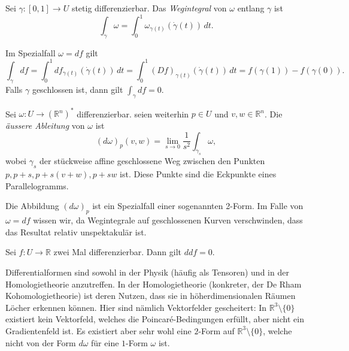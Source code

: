 \documentclass[../main.tex]{subfiles}
\begin{document}
\begin{definition}
  Sei $\gamma \colon [0, 1] \to U$ stetig differenzierbar.
  Das \emph{Wegintegral} von $\omega$ entlang $\gamma$ ist
  \[
    \int_\gamma \omega = \int_{0}^{1} \omega_{\gamma(t)}(\dot \gamma(t)) \, dt.
  \]
\end{definition}

\begin{remark}
  Im Spezialfall $\omega = df$ gilt
  \[
    \int_\gamma df = \int_{0}^{1} df_{\gamma(t)}(\dot \gamma(t)) \, dt
    = \int_{0}^{1} {(Df)}_{\gamma(t)}(\dot \gamma(t)) \, dt
    = f(\gamma(1)) - f(\gamma(0)).
  \]
  Falls $\gamma$ geschlossen ist, dann gilt
  $\int_\gamma df = 0$.
\end{remark}

\begin{definition}
  Sei $\omega \colon U \to {(\mathbb{R}^n)}^*$ differenzierbar.
  seien weiterhin $p \in U$ und $v, w \in \mathbb{R}^n$.
  Die \emph{äussere Ableitung} von $\omega$ ist
  \[
    {(d\omega)}_p(v, w)
    = \lim_{s \to 0} \frac{1}{s^2} \int_{\gamma_s} \omega,
  \]
  wobei $\gamma_s$ der stückweise affine
  geschlossene Weg zwischen den
  Punkten $p, p+s, p+ s(v + w), p+sw$ ist.
  Diese Punkte sind die Eckpunkte eines Parallelogramms.
\end{definition}

Die Abbildung ${(d \omega)}_p$ ist ein Spezialfall einer sogenannten
2-Form. Im Falle von $\omega = df$ wissen wir,
da Wegintegrale auf geschlossenen Kurven verschwinden,
dass das Resultat relativ unspektakulär ist.

\begin{theorem*}
  Sei $f \colon U \to \mathbb{R}$ zwei Mal
  differenzierbar.
  Dann gilt $ddf = 0$.
\end{theorem*}

Differentialformen sind sowohl in der Physik (häufig als Tensoren)
und in der Homologietheorie anzutreffen.
In der Homologietheorie (konkreter, der De Rham Kohomologietheorie)
ist deren Nutzen, dass sie in höherdimensionalen Räumen
Löcher erkennen können. Hier sind nämlich Vektorfelder gescheitert:
In $\mathbb{R}^3 \setminus \{0\}$ existiert kein Vektorfeld,
welches die Poincaré-Bedingungen erfüllt, aber
nicht ein Gradientenfeld ist.
Es existiert aber sehr wohl eine $2$-Form auf
$\mathbb{R}^3 \setminus \{0\}$, welche nicht von der Form
$d \omega$ für eine $1$-Form $\omega$ ist.
\end{document}

